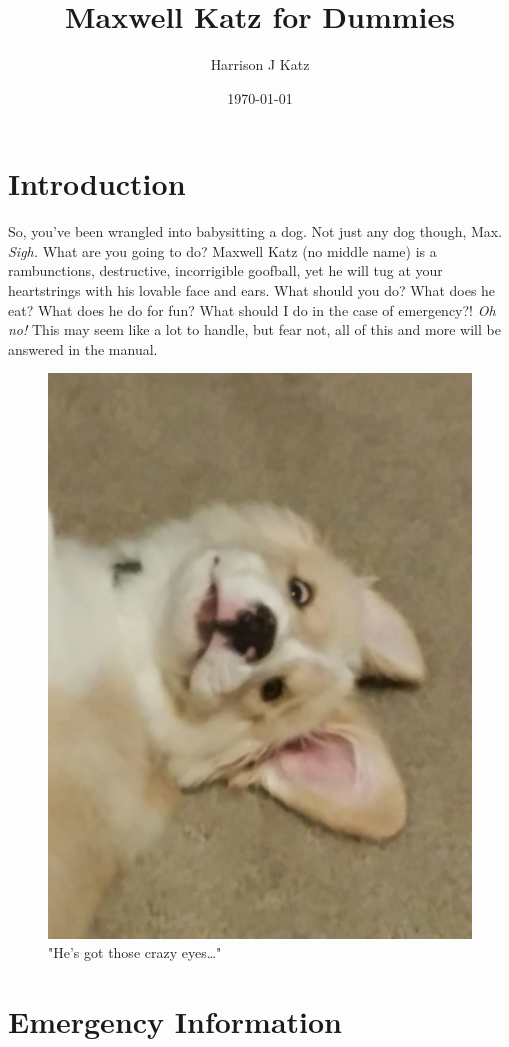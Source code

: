 \documentclass[pdftex,12pt]{article}
\title{Maxwell Katz for Dummies}
\author{Harrison J Katz}
\date{\today}
\begin{document}



\newpage
\tableofcontents

\newpage
\listoffigures

\newpage
{}

\section{Introduction}

So, you've been wrangled into babysitting a dog. Not just any dog though, Max.
\emph{Sigh.} What are you going to do? Maxwell Katz (no middle name) is a
rambunctions, destructive, incorrigible goofball, yet he will tug at your
heartstrings with his lovable face and ears. What should you do? What does he
eat? What does he do for fun? What should I do in the case of
emergency?! \emph{Oh no!} This may seem like a lot to handle, but fear not, 
all of this and more will be answered in the manual.

\bigskip

\begin{figure}[h!]
    \centering
    \includegraphics[width=.35\textwidth]{./images/max/crazy_eyes.jpg}
    \caption{"He's got those crazy eyes\ldots"}
    \label{fig:crazy_eyes}
\end{figure}

\newpage
\section{Emergency Information}
\end{document}
